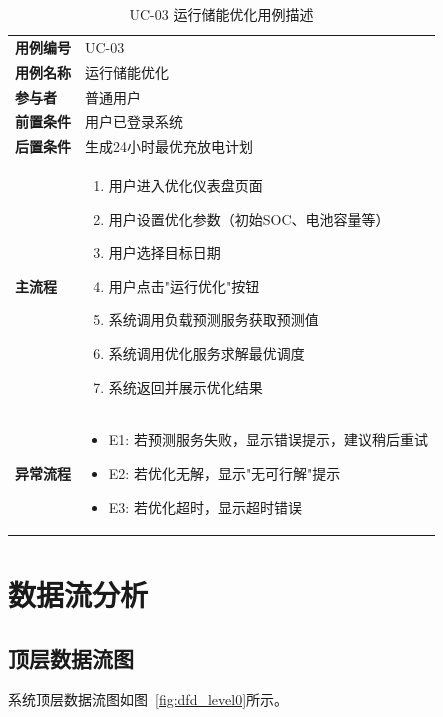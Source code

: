 \begin{table}[H]
  \centering
  \caption{UC-03 运行储能优化用例描述}
  \begin{tabular}{p{3cm}p{10cm}}
    \toprule
    \textbf{用例编号} & UC-03                 \\
    \textbf{用例名称} & 运行储能优化                \\
    \textbf{参与者}  & 普通用户                  \\
    \textbf{前置条件} & 用户已登录系统               \\
    \textbf{后置条件} & 生成24小时最优充放电计划         \\
    \midrule
    \textbf{主流程}  &
    \begin{enumerate}[leftmargin=*, nosep]
      \item 用户进入优化仪表盘页面
      \item 用户设置优化参数（初始SOC、电池容量等）
      \item 用户选择目标日期
      \item 用户点击"运行优化"按钮
      \item 系统调用负载预测服务获取预测值
      \item 系统调用优化服务求解最优调度
      \item 系统返回并展示优化结果
    \end{enumerate} \\
    \midrule
    \textbf{异常流程} &
    \begin{itemize}[leftmargin=*, nosep]
      \item E1: 若预测服务失败，显示错误提示，建议稍后重试
      \item E2: 若优化无解，显示"无可行解"提示
      \item E3: 若优化超时，显示超时错误
    \end{itemize}   \\
    \bottomrule
  \end{tabular}
\end{table}

\section{数据流分析}

\subsection{顶层数据流图}

系统顶层数据流图如图~\ref{fig:dfd_level0}所示。

